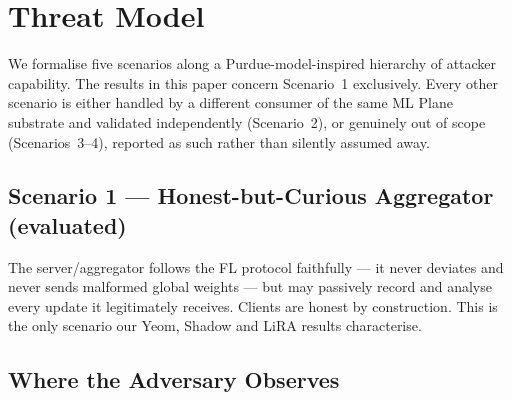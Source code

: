 %
%

\section{Threat Model}
\label{sec:threat-model}

We formalise five scenarios along a Purdue-model-inspired hierarchy of
attacker capability. The results in this paper concern Scenario~1
exclusively. Every other scenario is either handled by a different consumer
of the same ML Plane substrate and validated independently (Scenario~2), or
genuinely out of scope (Scenarios~3--4), reported as such rather than
silently assumed away.

\subsection{Scenario 1 --- Honest-but-Curious Aggregator (evaluated)}
\label{sec:threat-s1}

The server/aggregator follows the FL protocol faithfully --- it never
deviates and never sends malformed global weights --- but may passively
record and analyse every update it legitimately receives. Clients are honest
by construction. This is the only scenario our Yeom, Shadow and LiRA results
characterise.

\subsection{Where the Adversary Observes}
\label{sec:threat-observation}

